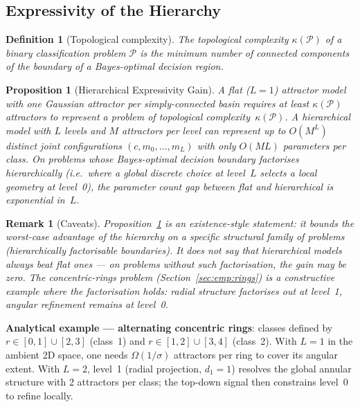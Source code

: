 \documentclass[11pt,a4paper]{article}
\newtheorem{proposition}[theorem]{Proposition}
\newtheorem{definition}[theorem]{Definition}
\newtheorem{remark}[theorem]{Remark}
\begin{document}
\subsection{Expressivity of the Hierarchy}
\label{sec:theory:expressivity}

\begin{definition}[Topological complexity]
The topological complexity $\kappa(\mathcal{P})$ of a binary classification problem
$\mathcal{P}$ is the minimum number of connected components of the boundary of a Bayes-optimal
decision region.
\end{definition}

\begin{proposition}[Hierarchical Expressivity Gain]
\label{prop:expressivity}
A flat ($L=1$) attractor model with one Gaussian attractor per simply-connected basin
requires at least $\kappa(\mathcal{P})$ attractors to represent a problem of topological
complexity~$\kappa(\mathcal{P})$. A hierarchical model with $L$ levels and $M$ attractors
per level can represent up to $O(M^L)$ distinct joint configurations $(c,m_0,\ldots,m_L)$
with only $O(ML)$ parameters per class. On problems whose Bayes-optimal decision boundary
factorises hierarchically (i.e.\ where a global discrete choice at level~$L$ selects a
local geometry at level~0), the parameter count gap between flat and hierarchical is
\emph{exponential in~$L$}.
\end{proposition}

\begin{remark}[Caveats]
Proposition~\ref{prop:expressivity} is an \emph{existence}-style statement: it bounds
the worst-case advantage of the hierarchy on a specific structural family of problems
(hierarchically factorisable boundaries). It does not say that hierarchical models always
beat flat ones --- on problems without such factorisation, the gain may be zero. The
concentric-rings problem (Section~\ref{sec:emp:rings}) is a constructive example where the
factorisation holds: radial structure factorises out at level~1, angular refinement
remains at level~0.
\end{remark}

\textbf{Analytical example --- alternating concentric rings}: classes defined by
$r \in [0,1] \cup [2,3]$ (class~1) and $r \in [1,2] \cup [3,4]$ (class~2). With $L=1$
in the ambient 2D space, one needs $\Omega(1/\sigma)$ attractors per ring to cover its
angular extent. With $L=2$, level~1 (radial projection, $d_1=1$) resolves the global
annular structure with 2 attractors per class; the top-down signal then constrains
level~0 to refine locally.
\end{document}
